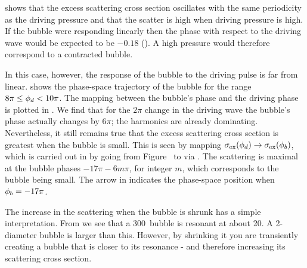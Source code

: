  shows that the excess scattering cross section oscillates with the same periodicity
as the driving pressure
and that the scatter is high when driving pressure is high.
If the bubble were responding linearly
then the phase with respect to the driving wave would be expected to be $-0.18$ ().
A high pressure would therefore correspond to a contracted bubble.

In this case, however, the response of the bubble to the driving pulse is far from linear.
 shows the phase-space trajectory of the bubble for the range $8\pi\le{\phi_d}<10\pi$.
The mapping between the bubble's phase and the driving phase is plotted in .
We find that for the $2\pi$ change in the driving wave the bubble's phase actually changes by $6\pi$;
the harmonics are already dominating.
Nevertheless, it still remains true that the excess scattering cross section is  greatest when the bubble is small.
This is seen by mapping  $\sigma_\textrm{ex}({\phi_d}) \rightarrow \sigma_\textrm{ex}({\phi_b})$,
which is carried out in by going from Figure~ to 
via .
The scattering is maximal at the bubble phases $-17\pi - 6m\pi$, for integer $m$, which corresponds to the bubble being small.
The arrow in  indicates the phase-space position when ${\phi_b} = -17\pi$.

The increase in the scattering when the bubble is shrunk has a simple interpretation.
From  we see that a \unit{300}\nano\metre\ bubble is resonant at about \unit{20}\mega\hertz.
A \unit{2}\micro\metre-diameter bubble is larger than this.
However, by shrinking it you are transiently creating a bubble that is closer to its resonance - and therefore increasing its scattering cross section.



